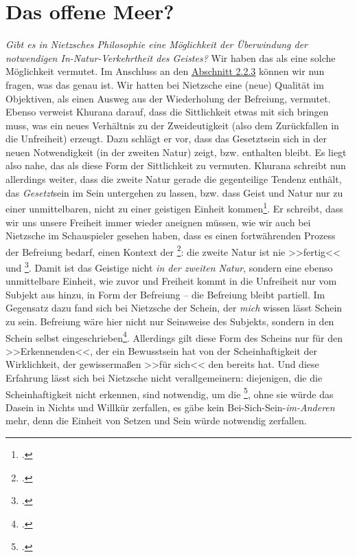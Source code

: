 \documentclass[12pt, a4paper, openany]{report}
\begin{document}
\section{Das offene Meer?}\label{abschnitt_4}
\textit{Gibt es in Nietzsches Philosophie eine Möglichkeit der Überwindung der notwendigen In-Natur-Verkehrtheit des Geistes?} 
Wir haben das  als eine solche Möglichkeit vermutet.
Im Anschluss an den \hyperref[abschnitt_2_3]{Abschnitt 2.2.3} können wir nun fragen, was das  genau ist.
Wir hatten bei Nietzsche eine (neue) Qualität im Objektiven, als einen Ausweg aus der Wiederholung der Befreiung, vermutet.
Ebenso verweist Khurana darauf, dass die Sittlichkeit etwas mit sich bringen muss, was ein neues Verhältnis zu der Zweideutigkeit (also dem Zurückfallen in die Unfreiheit) erzeugt.
Dazu schlägt er vor, dass das Gesetztsein sich in der neuen Notwendigkeit (in der zweiten Natur) zeigt, bzw. enthalten bleibt. 
Es liegt also nahe, das  als diese Form der Sittlichkeit zu vermuten. 
Khurana schreibt nun allerdings weiter, dass die zweite Natur gerade die gegenteilige Tendenz enthält, das \emph{Gesetzt}sein im Sein untergehen zu lassen, bzw. dass Geist und Natur nur zu einer unmittelbaren, nicht zu einer geistigen Einheit kommen\footcite[Vgl.][S. 401 ff]{khurana_freiheit_2017}.
Er schreibt, dass wir uns unsere Freiheit immer wieder aneignen müssen, wie wir auch bei Nietzsche im Schauspieler gesehen haben, dass es einen fortwährenden Prozess der Befreiung bedarf, einen Kontext der \footcite[][402]{khurana_freiheit_2017}: 
die zweite Natur ist nie >>fertig<< und \footcite[][81]{menke_autonomie_2018}.
Damit ist das Geistige nicht \emph{in der zweiten Natur}, sondern eine ebenso unmittelbare Einheit, wie zuvor und Freiheit kommt in die Unfreiheit nur vom Subjekt aus hinzu, in Form der Befreiung -- die Befreiung bleibt partiell. 
Im Gegensatz dazu fand sich bei Nietzsche der Schein, der \emph{mich} wissen lässt Schein zu sein. 
Befreiung wäre hier nicht nur Seinsweise des Subjekts, sondern in den Schein selbst eingeschrieben\footcite[Vgl.][339]{khurana_freiheit_2017}.
Allerdings gilt diese Form des Scheins nur für den >>Erkennenden<<, der ein Bewusstsein hat von der Scheinhaftigkeit der Wirklichkeit, der gewissermaßen >>für sich<< den  bereits  hat.
Und diese Erfahrung lässt sich bei Nietzsche nicht verallgemeinern:
diejenigen, die die Scheinhaftigkeit nicht erkennen, sind notwendig, um die \footcite[][417]{nietzsche_morgenrote_1999}, ohne sie würde das Dasein in Nichts und Willkür zerfallen, es gäbe kein Bei-Sich-Sein-\emph{im-Anderen} mehr, denn die Einheit von Setzen und Sein würde notwendig zerfallen.%
\end{document}
